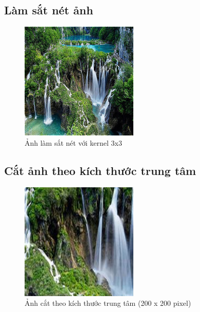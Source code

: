 \subsection{Làm sắt nét ảnh}
\begin{figure}[H]
	\centering
	\includegraphics[width=0.5\textwidth]{images/res/512_sharpened.png}
	\caption{Ảnh làm sắt nét với kernel 3x3}
	\label{fig:sharpen}
\end{figure}

\subsection{Cắt ảnh theo kích thước trung tâm}
\begin{figure}[H]
	\centering
	\includegraphics[width=0.5\textwidth]{images/res/512_crop_center.png}
	\caption{Ảnh cắt theo kích thước trung tâm (200 x 200 pixel)}
	\label{fig:crop_center}
\end{figure}

